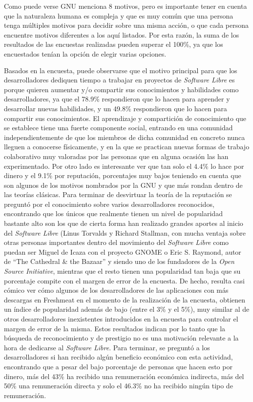 Como puede verse GNU menciona 8 motivos, pero es importante tener en cuenta que la naturaleza humana es compleja y que es muy común que una persona tenga múltiples motivos para decidir sobre una misma acción, o que cada persona encuentre motivos diferentes a los aquí listados. Por esta razón, la suma de los resultados de las encuestas realizadas pueden superar el 100\%, ya que los encuestados tenían la opción de elegir varias opciones.

Basados en la encuesta, puede observarse que el motivo principal para que los desarrolladores dediquen tiempo a trabajar en proyectos de \textit{Software Libre} es porque quieren aumentar y/o compartir sus conocimientos y habilidades como desarrolladores, ya que el 78.9\% respondieron que lo hacen para aprender y desarrollar nuevas habilidades, y un 49.8\% respondieron que lo hacen para compartir sus conocimientos.
El aprendizaje y compartición de conocimiento que se establece tiene una fuerte componente social, entrando en una comunidad independientemente de que los miembros de dicha comunidad en concreto nunca lleguen a conocerse físicamente, y en la que se practican nuevas formas de trabajo colaborativo muy valoradas por las personas que en alguna ocasión las han experimentado.
Por otro lado es interesante ver que tan solo el 4.4\% lo hace por dinero y el 9.1\% por reputación, porcentajes muy bajos teniendo en cuenta que son algunos de los motivos nombrados por la GNU y que más rondan dentro de las teorías clásicas.
Para terminar de desvirtuar la teoría de la reputación se preguntó por el conocimiento sobre varios desarrolladores reconocidos, encontrando que los únicos que realmente tienen un nivel de popularidad bastante alto son los que de cierta forma han realizado grandes aportes al inicio del \textit{Software Libre} (Linus Torvalds y Richard Stallman, con mucha ventaja sobre otras personas importantes dentro del movimiento del \textit{Software Libre} como puedan ser Miguel de Icaza con el proyecto GNOME o Eric S. Raymond, autor de ``The Cathedral \& the Bazaar'' y siendo uno de los fundadores de la \textit{Open Source Initiative}, mientras que el resto tienen una popularidad tan baja que su porcentaje compite con el margen de error de la encuesta. De hecho, resulta casi cómico ver cómo algunos de los desarrolladores de las aplicaciones con más descargas en Freshmeat en el momento de la realización de la encuesta, obtienen un índice de popularidad además de bajo (entre el 3\% y el 5\%), muy similar al de otros desarrolladores inexistentes introducidos en la encuesta para controlar el margen de error de la misma. Estos resultados indican por lo tanto que la búsqueda de reconocimiento y de prestigio no es una motivación relevante a la hora de dedicarse al \textit{Software Libre}.
Para terminar, se preguntó a los desarrolladores si han recibido algún beneficio económico con esta actividad, encontrando que a pesar del bajo porcentaje de personas que hacen esto por dinero, más del 43\% ha recibido una remuneración económica indirecta, más del 50\% una remuneración directa y solo el 46.3\% no ha recibido ningún tipo de remuneración.

